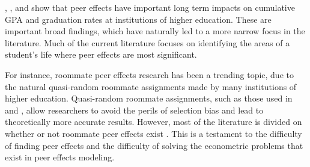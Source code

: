 \documentclass[12pt,letterpaper,english,fleqn]{article}
\begin{document}
\citet{smith2015new}, \citet{luppino2015college}, and \citet{ost2010role} show that peer effects have important long term impacts on cumulative GPA and graduation rates at institutions of higher education.
These are important broad findings, which have naturally led to a more narrow focus in the literature.
Much of the current literature focuses on identifying the areas of a student's life where peer effects are most significant. 

For instance, roommate peer effects research has been a trending topic, due to the natural quasi-random roommate assignments made by many institutions of higher education.
Quasi-random roommate assignments, such as those used in \citet{griffith2014peer} and \citet{zimmerman2003peer}, allow researchers to avoid the perils of selection bias and lead to theoretically more accurate results.
However, most of the literature is divided on whether or not roommate peer effects exist \citep{griffith2014peer,zimmerman2003peer,sacerdote2000peer,foster2006s,mcewan2006roommate}.
This is a testament to the difficulty of finding peer effects and the difficulty of solving the econometric problems that exist in peer effects modeling.
\end{document}
